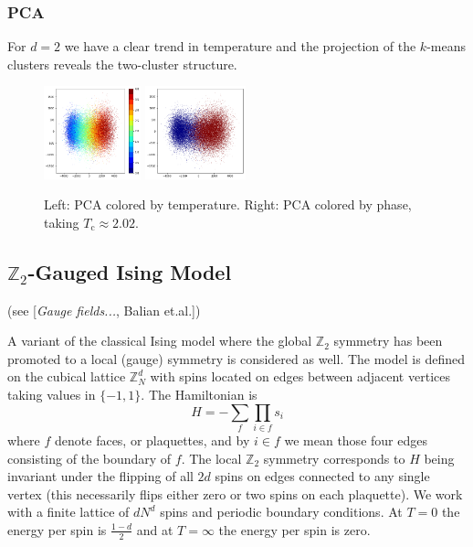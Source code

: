 \documentclass[11pt]{article}
\begin{document}
\subsubsection{PCA}
For $d=2$ we have a clear trend in temperature and the projection of the $k$-means clusters reveals the two-cluster structure.
\begin{figure}[h]
    \centering
    \includegraphics[width=0.25\textwidth]{squareice_images/pca_2d_squareice}
    \includegraphics[width=0.26\textwidth]{squareice_images/pca_phase_2d_squareice}
    \caption{Left: PCA colored by temperature. Right: PCA colored by phase, taking $T_\text{c}\approx2.02$.}
    \label{fig:SquareicePCA}
\end{figure}

\newpage
\subsection{$\mathbb{Z}_2$-Gauged Ising Model}
(see [\textit{Gauge fields...}, Balian et.al.])

A variant of the classical Ising model where the global $\mathbb{Z}_2$ symmetry has been promoted to a local (gauge) symmetry is considered as well. The model is defined on the cubical lattice $\mathbb{Z}_N^d$ with spins located on edges between adjacent vertices taking values in $\{{-1},1\}$. The Hamiltonian is
\begin{equation}
    H = - \sum_f\prod_{i\in f}s_i
\end{equation}
where $f$ denote faces, or plaquettes, and by $i\in f$ we mean those four edges consisting of the boundary of $f$. The local $\mathbb{Z}_2$ symmetry corresponds to $H$ being invariant under the flipping of all $2d$ spins on edges connected to any single vertex (this necessarily flips either zero or two spins on each plaquette). We work with a finite lattice of $dN^d$ spins and periodic boundary conditions. At $T=0$ the energy per spin is $\frac{1-d}{2}$ and at $T=\infty$ the energy per spin is zero.
\end{document}
